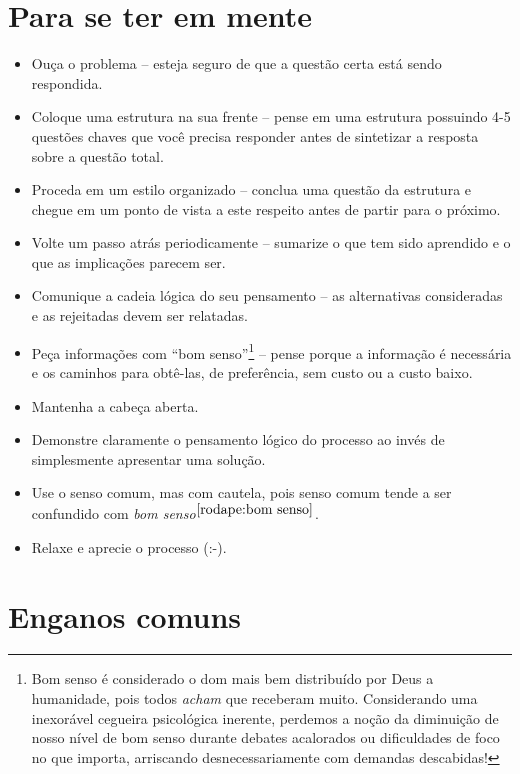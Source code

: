 \section{Para se ter em mente}

\begin{itemize}
	\item  Ouça o problema -- esteja seguro de que a questão certa está sendo
	respondida.
	\item Coloque uma estrutura na sua frente -- pense em uma estrutura
	possuindo 4-5 questões chaves que você precisa responder antes de
	sintetizar a resposta sobre a questão total.
	\item  Proceda em um estilo organizado -- conclua uma questão da estrutura
	e chegue em um ponto de vista a este respeito antes de partir para o
	próximo.
	\item  Volte um passo atrás periodicamente -- sumarize o que tem sido
	aprendido e o que as implicações parecem ser.
	\item  Comunique a cadeia lógica do seu pensamento -- as alternativas
	consideradas e as rejeitadas devem ser relatadas.
	\item  Peça informações com ``bom senso''\footnote{\label{rodape:bom senso}Bom senso é considerado o dom mais bem distribuído por Deus a humanidade, pois todos \emph{acham} que receberam muito. Considerando uma  inexorável cegueira psicológica inerente,  perdemos a noção da diminuição de nosso nível de bom senso durante debates acalorados ou dificuldades de foco no que importa, arriscando desnecessariamente com demandas descabidas!} -- pense porque a informação é
	necessária e os caminhos para obtê-las, de preferência, sem custo ou a
	custo baixo.
	\item  Mantenha a cabeça aberta.
	\item  Demonstre claramente o pensamento lógico do
	processo ao invés de simplesmente apresentar uma solução.
	\item  Use o senso comum, mas com cautela, pois senso comum tende a ser confundido com \emph{bom senso}${}^{\ref{rodape:bom senso}}$.
	\item  Relaxe e aprecie o processo (:-).
\end{itemize}

\section{Enganos comuns}


